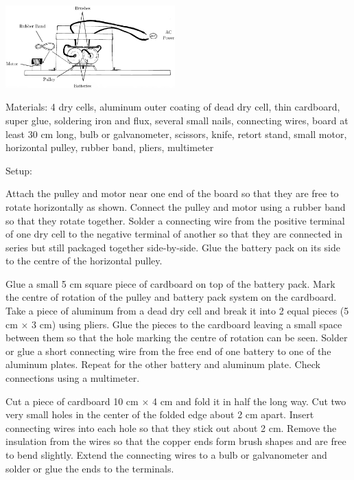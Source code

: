 \begin{multicols}{2}
\begin{center}
\includegraphics[width=0.49\textwidth]{./img/inverter.png}
\end{center}

\begin{description*}
\item[Materials:]{4 dry cells, aluminum outer coating of dead dry cell, thin cardboard, super glue, soldering iron and flux, several small nails, connecting wires, board at least 30 cm long, bulb or galvanometer, scissors, knife, retort stand, small motor, horizontal pulley, rubber band, pliers, multimeter}
\item[Setup:]{Attach the pulley and motor near one end of the board so that they are free to rotate horizontally as shown. Connect the pulley and motor using a rubber band so that they rotate together. Solder a connecting wire from the positive terminal of one dry cell to the negative terminal of another so that they are connected in series but still packaged together side-by-side. Glue the battery pack on its side to the centre of the horizontal pulley. 

Glue a small 5 cm square piece of cardboard on top of the battery pack. Mark the centre of rotation of the pulley and battery pack system on the cardboard. Take a piece of aluminum from a dead dry cell and break it into 2 equal pieces (5 cm $\times$ 3 cm) using pliers. Glue the pieces to the cardboard leaving a small space between them so that the hole marking the centre of rotation can be seen. Solder or glue a short connecting wire from the free end of one battery to one of the aluminum plates. Repeat for the other battery and aluminum plate. Check connections using a multimeter. 

Cut a piece of cardboard 10 cm $\times$ 4 cm and fold it in half the long way. Cut two very small holes in the center of the folded edge about 2 cm apart. Insert connecting wires into each hole so that they stick out about 2 cm. Remove the insulation from the wires so that the copper ends form brush shapes and are free to bend slightly. Extend the connecting wires to a bulb or galvanometer and solder or glue the ends to the terminals.

}
\end{description*}
\end{multicols}
